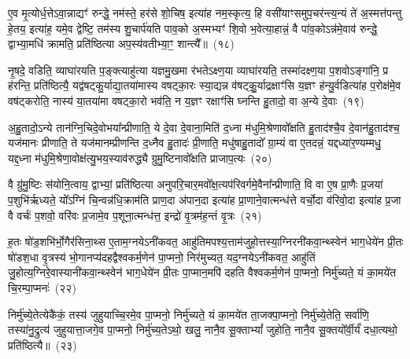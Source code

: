 ए॒व मृ॒त्योर्ध॒त्ते\-ऽवा॒न्नाद्यꣳ॑ रुन्द्धे॒ नम॑स्ते॒ हर॑से शो॒चिष॒ इत्या॑ह नम॒स्कृत्य॒ हि वसी॑याꣳसमुप॒चर॑न्त्य॒न्यं ते॑ अ॒स्मत्त॑पन्तु हे॒तय॒ इत्या॑ह॒ यमे॒व द्वेष्टि॒ तम॑स्य शु॒चार्प॑यति पाव॒को अ॒स्मभ्यꣳ॑ शि॒वो भ॒वेत्या॒हान्नं॒ वै पा॑व॒को\-ऽन्न॑मे॒वाव॑ रुन्द्धे॒ द्वाभ्या॒मधि॑ क्रामति॒ प्रति॑ष्ठित्या अप॒स्य॑वतीभ्या॒ꣳ॒ शान्त्यै᳚॥~(१८)

{\anuvakamend[{शुग्वे॑त॒सो॑\-ऽपाम॑ष्टा॒भिर्विक॑र्\mbox{}षति॒ नान्तरेका॒न्नप॑ञ्चा॒शच्च॑}]}%

नृ॒षदे॒ वडिति॒ व्याघा॑रयति प॒ङ्क्त्याहु॑त्या यज्ञमु॒खमा र॑भते\-ऽक्ष्ण॒या व्याघा॑रयति॒ तस्मा॑दक्ष्ण॒या प॒शवो\-ऽङ्गा॑नि॒ प्र ह॑रन्ति॒ प्रति॑ष्ठित्यै॒ यद्व॑षट्कु॒र्याद्या॒तया॑मास्य वषट्का॒रः स्या॒द्यन्न व॑षट्कु॒॒र्याद्रक्षाꣳ॑सि य॒ज्ञꣳ ह॑न्यु॒र्वडित्या॑ह प॒रोक्ष॑मे॒व वष॑ट्करोति॒ नास्य॑ या॒तया॑मा वषट्का॒रो भव॑ति॒ न य॒ज्ञꣳ रक्षाꣳ॑सि घ्नन्ति हु॒तादो॒ वा अ॒न्ये दे॒वाः~(१९)

अ॒हु॒तादो॒\-ऽन्ये तान॑ग्नि॒चिदे॒वोभया᳚न्प्रीणाति॒ ये दे॒वा दे॒वाना॒मिति॑ द॒ध्ना म॑धुमि॒श्रेणावो᳚क्षति हु॒ताद॑श्चै॒व दे॒वान॑हु॒ताद॑श्च॒ यज॑मानः प्रीणाति॒ ते यज॑मानम्प्रीणन्ति द॒ध्नैव हु॒तादः॑ प्री॒णाति॒ मधु॑षाहु॒तादो᳚ ग्रा॒म्यं वा ए॒तदन्नं॒ यद्दध्या॑र॒ण्यम्मधु॒ यद्द॒ध्ना म॑धुमि॒श्रेणा॒वोक्ष॑त्यु॒भय॒स्याव॑रुद्ध्यै ग्रुमु॒ष्टिनावो᳚क्षति प्राजाप॒त्यः~(२०)

वै ग्रु॑मु॒ष्टिः स॑योनि॒त्वाय॒ द्वाभ्यां॒ प्रति॑ष्ठित्या अनुपरि॒चार॒मवो᳚क्ष॒त्यप॑रिवर्गमे॒वैना᳚न्प्रीणाति॒ वि वा ए॒ष प्रा॒णैः प्र॒जया॑ प॒शुभि॑र्\mbox{}ऋध्यते॒ यो᳚\-ऽग्निं चि॒न्वन्न॑धि॒क्राम॑ति प्राण॒दा अ॑पान॒दा इत्या॑ह प्रा॒णाने॒वात्मन्ध॑त्ते वर्चो॒दा व॑रिवो॒दा इत्या॑ह प्र॒जा वै वर्चः॑ प॒शवो॒ वरि॑वः प्र॒जामे॒व प॒शूना॒त्मन्ध॑त्त॒ इन्द्रो॑ वृ॒त्रम॑ह॒न्तं वृ॒त्रः~(२१)

ह॒तः षो॑ड॒शभि॑र्भो॒गैर॑सिना॒थ्स ए॒ताम॒ग्नये\-ऽनी॑कवत॒ आहु॑तिमपश्य॒त्ताम॑जुहो॒त्तस्या॒ग्निरनी॑कवा॒न्थ्स्वेन॑ भाग॒धेये॑न प्री॒तः षो॑डश॒धा वृ॒त्रस्य॑ भो॒गानप्य॑दहद्वैश्वकर्म॒णेन॑ पा॒प्मनो॒ निर॑मुच्यत॒ यद॒ग्नये\-ऽनी॑कवत॒ आहु॑तिं जु॒होत्य॒ग्निरे॒वास्यानी॑कवा॒न्थ्स्वेन॑ भाग॒धेये॑न प्री॒तः पा॒प्मान॒मपि॑ दहति वैश्वकर्म॒णेन॑ पा॒प्मनो॒ निर्मु॑च्यते॒ यं का॒मये॑त चि॒रम्पा॒प्मनः॑~(२२)

निर्मु॑च्ये॒तेत्येकै॑कं॒ तस्य॑ जुहुयाच्चि॒रमे॒व पा॒प्मनो॒ निर्मु॑च्यते॒ यं का॒मये॑त ता॒जक्पा॒प्मनो॒ निर्मु॑च्ये॒तेति॒ सर्वा॑णि॒ तस्या॑नु॒द्रुत्य॑ जुहुयात्ता॒जगे॒व पा॒प्मनो॒ निर्मु॑च्य॒ते\-ऽथो॒ खलु॒ नानै॒व सू॒क्ता\-भ्यां᳚ जुहोति॒ नानै॒व सू॒क्तयो᳚र्वी॒र्यं॑ दधा॒त्यथो॒ प्रति॑ष्ठित्यै॥~(२३)

{\anuvakamend[{दे॒वाः प्रा॑जाप॒त्यो वृ॒त्रश्चि॒रं पा॒प्मन॑श्चत्वारि॒ꣳ॒शच्च॑}]}%

